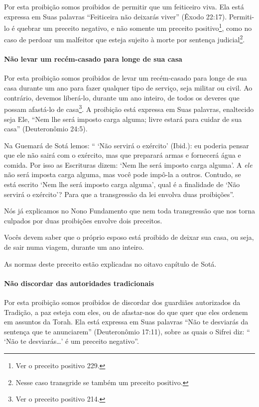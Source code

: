 Por esta proibição somos proibidos de permitir que um feiticeiro viva.
Ela está expressa em Suas palavras ``Feiticeira não deixarás viver''
(Êxodo 22:17). Permiti-lo é quebrar um preceito negativo, e não somente um
preceito positivo\footnote{Ver o preceito positivo 229.}, como no caso de perdoar um
malfeitor que esteja sujeito à morte por sentença
judicial\footnote{Nesse caso transgride se também um preceito positivo.}.

\paragraph{Não levar um recém-casado para longe de sua casa}

Por esta proibição somos proibidos de levar um recém-casado para longe
de sua casa durante um ano para fazer qualquer tipo de serviço, seja
militar ou civil. Ao contrário, devemos liberá-lo, durante um ano
inteiro, de todos os deveres que possam afastá-lo de
casa\footnote{Ver o preceito positivo 214.}. A proibição está expressa em Suas palavras,
enaltecido seja Ele, ``Nem lhe será imposto carga alguma; livre estará
para cuidar de sua casa'' (Deuteronômio 24:5).

Na Guemará de Sotá lemos: `` `Não servirá o exército' (Ibid.): eu
poderia pensar que ele não sairá com o exército, mas que preparará armas
e fornecerá água e comida. Por isso as Escrituras dizem: `Nem lhe será
imposto carga alguma'. A \emph{ele} não será imposta carga alguma, mas
você pode impô-la a outros. Contudo, se está escrito `Nem lhe será
imposto carga alguma', qual é a finalidade de `Não servirá o exército'?
Para que a transgressão da lei envolva duas proibições''.

Nós já explicamos no Nono Fundamento que nem toda transgressão que nos
torna culpados por duas proibições envolve dois preceitos.

Vocês devem saber que o próprio esposo está proibido de deixar sua casa,
ou seja, de sair numa viagem, durante um ano inteiro.

As normas deste preceito estão explicadas no oitavo capítulo de Sotá.

\paragraph{Não discordar das autoridades tradicionais}

Por esta proibição somos proibidos de discordar dos guardiães
autorizados da Tradição, a paz esteja com eles, ou de afastar-nos do que
quer que eles ordenem em assuntos da Torah. Ela está expressa em Suas
palavras ``Não te desviarás da sentença que te anunciarem''
(Deuteronômio 17:11), sobre as quais o Sifrei diz: `` `Não te
desviarás\ldots{}' é um preceito negativo''.

